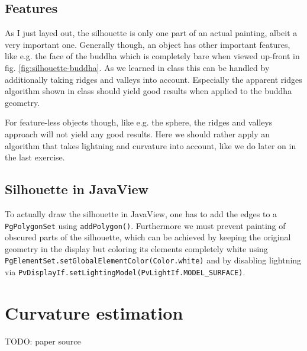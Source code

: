 \documentclass[a4paper,10pt,notitlepage]{scrreprt}
\begin{document}
\section{Features}

As I just layed out, the silhouette is only one part of an actual painting,
albeit a very important one. Generally though, an object has other important
features, like e.g. the face of the buddha which is completely bare when viewed
up-front in fig. \ref{fig:silhouette-buddha}. As we learned in class this can
be handled by additionally taking ridges and valleys into account. Especially
the apparent ridges algorithm shown in class should yield good results when
applied to the buddha geometry.

For feature-less objects though, like e.g. the sphere, the ridges and
valleys approach will not yield any good results. Here we should rather apply
an algorithm that takes lightning and curvature into account, like we do later
on in the last exercise.

\section{Silhouette in JavaView}

To actually draw the silhouette in JavaView, one has to add the edges to a
\texttt{PgPolygonSet} using \texttt{addPolygon()}. Furthermore we must prevent
painting of obscured parts of the silhouette, which can be achieved by
keeping the original geometry in the display but coloring its elements
completely white using \texttt{PgElementSet.setGlobalElementColor(Color.white)}
and by disabling lightning via
\texttt{PvDisplayIf.setLightingModel(PvLightIf.MODEL\_SURFACE)}.

\chapter{Curvature estimation}

TODO: paper source



% 
\end{document}
